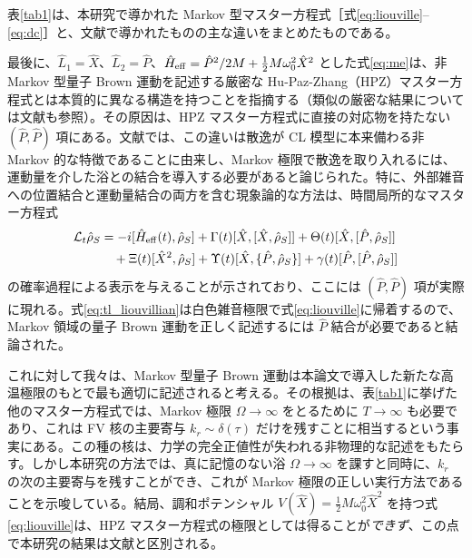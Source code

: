 表\ref{tab1}は、本研究で導かれた Markov 型マスター方程式［式\eqref{eq:liouville}--\eqref{eq:dc}］と、文献\cite{Diosi1993,Diosi1993a,CaldeiraLeggettA,BP2002}で導かれたものの主な違いをまとめたものである。

最後に、$\hat L_1=\hat X$、$\hat L_2=\hat P$、$\hat H_{\rm eff}=\hat P^2/2M+\frac12M\omega_0^2\hat X^2$ とした式\eqref{eq:me}は、非 Markov 型量子 Brown 運動を記述する厳密な Hu-Paz-Zhang（HPZ）マスター方程式\cite{Hu1992}とは本質的に異なる構造を持つことを指摘する（類似の厳密な結果については文献\cite{Strunz1996,DiosiStrunz1997,DiosiGisinStrunz1998,Yu2004,StrunzYu2004,DiosiFerialdi2014,Ferialdi2016}も参照）。その原因は、HPZ マスター方程式に直接の対応物を持たない $(\hat P,\hat P)$ 項にある。文献\cite{Ferialdi2016,Ferialdi2017}では、この違いは散逸が CL 模型に本来備わる非 Markov 的な特徴であることに由来し、Markov 極限で散逸を取り入れるには、運動量を介した浴との結合を導入する必要があると論じられた\cite{Diosi1995,Halliwell1995,Gao1997,Vacchini2000}。特に、外部雑音への位置結合と運動量結合の両方を含む現象論的な方法は、時間局所的なマスター方程式\cite{Ferialdi2016}
\begin{align}\label{eq:tl_liouvillian}
\mathcal L_t\hat\rho_S&=-i[\hat H_{\rm eff}(t),\hat\rho_S]+\Gamma(t)[\hat X,[\hat X,\hat\rho_S]]+\Theta(t)[\hat X,[\hat P,\hat\rho_S]]\nonumber\\
&\quad+\Xi(t)[\hat X^2,\hat\rho_S]+\Upsilon(t)[\hat X,\{\hat P,\hat\rho_S\}]+\gamma(t)[\hat P,[\hat P,\hat\rho_S]]
\end{align}
の確率過程による表示を与えることが示されており、ここには $(\hat P,\hat P)$ 項が実際に現れる。式\eqref{eq:tl_liouvillian}は白色雑音極限で式\eqref{eq:liouville}に帰着するので、Markov 領域の量子 Brown 運動を正しく記述するには $\hat P$ 結合が必要であると結論された。

これに対して我々は、Markov 型量子 Brown 運動は本論文で導入した新たな高温極限のもとで最も適切に記述されると考える。その根拠は、表\ref{tab1}に挙げた他のマスター方程式では、Markov 極限 $\Omega\to\infty$ をとるために $T\to\infty$ も必要であり、これは FV 核の主要寄与 $k_r\sim\delta(\tau)$ だけを残すことに相当するという事実にある。この種の核は、力学の完全正値性が失われる非物理的な記述をもたらす。しかし本研究の方法では、真に記憶のない浴 $\Omega\to\infty$ を課すと同時に、$k_r$ の次の主要寄与を残すことができ、これが Markov 極限の正しい実行方法であることを示唆している。結局、調和ポテンシャル $V(\hat X)=\frac12M\omega_0^2\hat X^2$ を持つ式\eqref{eq:liouville}は、HPZ マスター方程式\cite{BP2002}の極限としては得ることが\textit{できず}、この点で本研究の結果は文献\cite{Hu1992,StrunzYu2004,Yu2004}と区別される。

